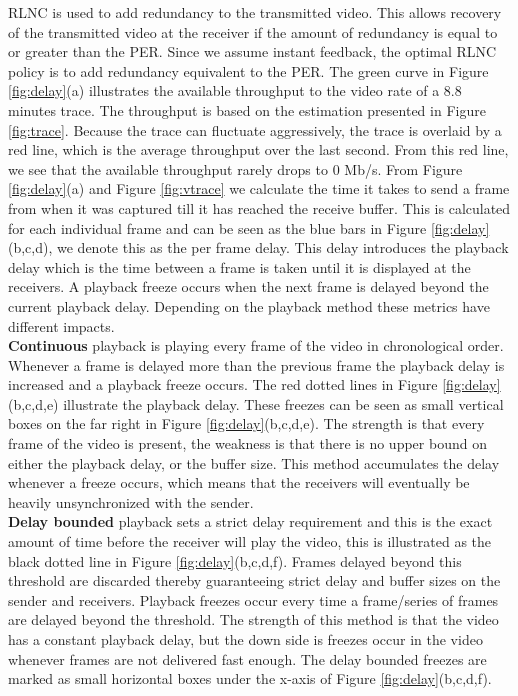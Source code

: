 RLNC is used to add redundancy to the transmitted video. This allows recovery of the transmitted video at the receiver if the amount of redundancy is equal to or greater than the PER. Since we assume instant feedback, the optimal RLNC policy is to add redundancy equivalent to the PER. The green curve in Figure \ref{fig:delay}(a) illustrates the available throughput to the video rate of a 8.8 minutes trace. The throughput is based on the estimation presented in Figure \ref{fig:trace}. Because the trace can fluctuate aggressively, the trace is overlaid by a red line, which is the average throughput over the last second. From this red line, we see that the available throughput rarely drops to 0 Mb/s. From Figure \ref{fig:delay}(a) and Figure \ref{fig:vtrace} we calculate the time it takes to send a frame
from when it was captured till it has reached the receive buffer.
This is calculated for each individual frame and can be seen as the blue bars in Figure \ref{fig:delay}(b,c,d), we denote this as the per frame delay. This delay introduces the playback delay which is the time between a frame is taken until it is displayed at the receivers. A playback freeze occurs when the next frame is delayed beyond the current playback delay. Depending on the playback method these metrics have different impacts.\\
\textbf{Continuous} playback is playing every frame of the video in chronological order. Whenever a frame is delayed more than the previous frame the playback delay is increased and a playback freeze occurs. The red dotted lines in Figure \ref{fig:delay}(b,c,d,e) illustrate the playback delay. These freezes can be seen as small vertical boxes on the far right in Figure \ref{fig:delay}(b,c,d,e). The strength is that every frame of the video is present, the weakness is that there is no upper bound on either the playback delay, or the buffer size. This method accumulates the delay whenever a freeze occurs, which means that the receivers will eventually be heavily unsynchronized with the sender.  \\
%
\textbf{Delay bounded} playback sets a strict delay requirement and this is the exact amount of time before the receiver will play the video, this is illustrated as the black dotted line in Figure \ref{fig:delay}(b,c,d,f). Frames delayed beyond this threshold are discarded thereby guaranteeing strict delay and buffer sizes on the sender and receivers. Playback freezes occur every time a frame/series of frames are delayed beyond the threshold. The strength of this method is that the video has a constant playback delay, but the down side is freezes occur in the video whenever frames are not delivered fast enough. The delay bounded freezes are marked as small horizontal boxes under the x-axis of Figure \ref{fig:delay}(b,c,d,f).

